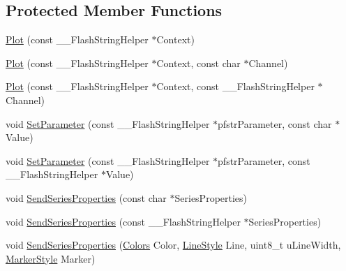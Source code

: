 \subsection*{Protected Member Functions}
\begin{DoxyCompactItemize}
\item 
\hyperlink{class_plot_a86f653c10557e372ce424009bdf07d26}{Plot} (const \-\_\-\-\_\-\-Flash\-String\-Helper $\ast$Context)
\item 
\hyperlink{class_plot_abc27a07a45392c7b586351c2cffe1d03}{Plot} (const \-\_\-\-\_\-\-Flash\-String\-Helper $\ast$Context, const char $\ast$Channel)
\item 
\hyperlink{class_plot_a2b10fb9b8af6d082ed994dacb5ed9dfa}{Plot} (const \-\_\-\-\_\-\-Flash\-String\-Helper $\ast$Context, const \-\_\-\-\_\-\-Flash\-String\-Helper $\ast$Channel)
\item 
void \hyperlink{class_plot_af2c91d5804ab8ba7612134f86d7ad0ec}{Set\-Parameter} (const \-\_\-\-\_\-\-Flash\-String\-Helper $\ast$pfstr\-Parameter, const char $\ast$Value)
\item 
void \hyperlink{class_plot_a6d7b98e6db2e52b543359eea924bc976}{Set\-Parameter} (const \-\_\-\-\_\-\-Flash\-String\-Helper $\ast$pfstr\-Parameter, const \-\_\-\-\_\-\-Flash\-String\-Helper $\ast$Value)
\item 
void \hyperlink{class_plot_a128537f83f04ba31491af41ca06cbbc0}{Send\-Series\-Properties} (const char $\ast$Series\-Properties)
\item 
void \hyperlink{class_plot_aa59196fc9d6d21387d4ebd32feb82fe2}{Send\-Series\-Properties} (const \-\_\-\-\_\-\-Flash\-String\-Helper $\ast$Series\-Properties)
\item 
void \hyperlink{class_plot_a74ebe0d836107d1774c113c6ca3774bd}{Send\-Series\-Properties} (\hyperlink{class_plot_af4d6704578791a812f3f78617adc7040}{Colors} Color, \hyperlink{class_plot_a05a5ea232f5115847a9861a9660205c7}{Line\-Style} Line, uint8\-\_\-t u\-Line\-Width, \hyperlink{class_plot_a888bde9c76bb38843a5ab09097cbeeab}{Marker\-Style} Marker)
\end{DoxyCompactItemize}


